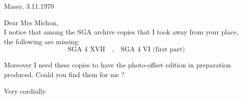 \begin{flushright}
Massy, 3.11.1970\\
\end{flushright}
Dear Mrs Michon,\\

I notice that among the SGA archive copies that I took away from your place, the following are missing:
\[
\text{SGA 4 XVII}\quad,\quad\text{SGA 4 VI (first part)}
\]

Moreover I need these copies to have the photo-offset edition in preparation produced. Could you find them for me ?

Very cordially\\
